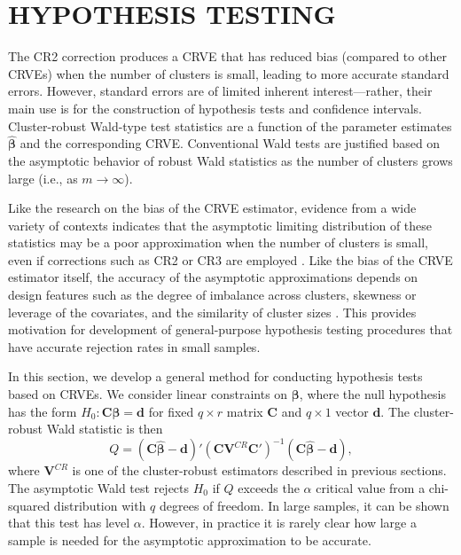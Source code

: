 \documentclass[draft]{ectaart}\usepackage[]{graphicx}\usepackage[]{color}
\newcommand{\bm}{\mathbf}
\newcommand{\bs}{\boldsymbol}
\begin{document}
\section{HYPOTHESIS TESTING}
\label{sec:testing}

The CR2 correction produces a CRVE that has reduced bias (compared to other CRVEs) when the number of clusters is small, leading to more accurate standard errors. However, standard errors are of limited inherent interest---rather, their main use is for the construction of hypothesis tests and confidence intervals.
Cluster-robust Wald-type test statistics are a function of the parameter estimates $\bs{\hat\beta}$ and the corresponding CRVE.
Conventional Wald tests are justified based on the asymptotic behavior of robust Wald statistics as the number of clusters grows large (i.e., as $m \to \infty$). 

Like the research on the bias of the CRVE estimator, evidence from a wide variety of contexts indicates that the asymptotic limiting distribution of these statistics may be a poor approximation when the number of clusters is small, even if corrections such as CR2 or CR3 are employed \citep{Bell2002bias, Bertrand2004how, Cameron2008bootstrap}. 
Like the bias of the CRVE estimator itself, the accuracy of the asymptotic approximations depends on design features such as the degree of imbalance across clusters, skewness or leverage of the covariates, and the similarity of cluster sizes \citep{McCaffrey2001generalizations, Tipton2015small-F, Webb2013wild, Carter2013asymptotic}. 
This provides motivation for development of general-purpose hypothesis testing procedures that have accurate rejection rates in small samples.

In this section, we develop a general method for conducting hypothesis tests based on CRVEs. We consider linear constraints on $\bs\beta$, where the null hypothesis has the form $H_0: \bm{C}\bs\beta = \bm{d}$ for fixed $q \times r$ matrix $\bm{C}$ and $q \times 1$ vector $\bm{d}$. 
The cluster-robust Wald statistic is then
\begin{equation}
\label{eq:Wald_stat}
Q = \left(\bm{C}\bs{\hat\beta} - \bm{d}\right)'\left(\bm{C} \bm{V}^{CR} \bm{C}'\right)^{-1}\left(\bm{C}\bs{\hat\beta} - \bm{d}\right),
\end{equation}
where $\bm{V}^{CR}$ is one of the cluster-robust estimators described in previous sections. 
The asymptotic Wald test rejects $H_0$ if $Q$ exceeds the $\alpha$ critical value from a chi-squared distribution with $q$ degrees of freedom. 
In large samples, it can be shown that this test has level $\alpha$. 
However, in practice it is rarely clear how large a sample is needed for the asymptotic approximation to be accurate. 
\end{document}

